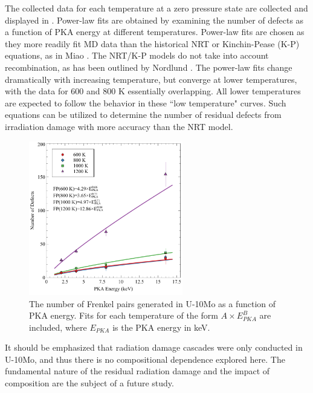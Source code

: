 \documentclass[review]{elsarticle}
\begin{document}
The collected data for each temperature at a zero pressure state are collected and displayed in . Power-law fits are obtained by examining the number of defects as a function of PKA energy at different temperatures. Power-law fits are chosen as they more readily fit MD data than the historical NRT \cite{norgett1975} or Kinchin-Pease (K-P) \cite{kinchin1955} equations, as in Miao \cite{miao2015}. The NRT/K-P models do not take into account recombination, as has been outlined by Nordlund \cite{nordlund2018}. The power-law fits change dramatically with increasing temperature, but converge at lower temperatures, with the data for 600 and 800 K essentially overlapping. All lower temperatures are expected to follow the behavior in these ``low temperature" curves. Such equations can be utilized to determine the number of residual defects from irradiation damage with more accuracy than the NRT model. 

\begin{figure}[h!]
    \centering
    \includegraphics[width=0.6\textwidth]{FPvsE.pdf}
    \caption{The number of Frenkel pairs generated in U-10Mo as a function of PKA energy. Fits for each temperature of the form $A{\times}E_{PKA}^B$ are included, where $E_{PKA}$ is the PKA energy in keV.}
    \label{fig:def_power}
\end{figure}

It should be emphasized that radiation damage cascades were only conducted in U-10Mo, and thus there is no compositional dependence explored here. The fundamental nature of the residual radiation damage and the impact of composition are the subject of a future study. 

\FloatBarrier
\end{document}
